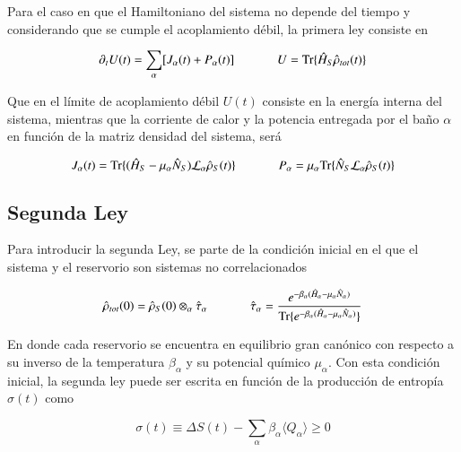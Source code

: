 Para el caso en que el Hamiltoniano del sistema no depende del tiempo y considerando que se cumple el acoplamiento débil, la primera ley consiste en

\begin{equation*}
    \partial_{t}U(t) = \sum_{\alpha}[J_{\alpha}(t) + P_{\alpha}(t) ] \hspace{12mm} U = \text{Tr}\{\hat{H}_{S}\hat{\rho}_{tot}(t) \}
\end{equation*}

Que en el límite de acoplamiento débil $U(t)$ consiste en la energía interna del sistema, mientras que la corriente de calor y la potencia entregada por el baño $\alpha$ en función de la matriz densidad del sistema, será 

\begin{equation*}
    J_{\alpha}(t) = \text{Tr}\{(\hat{H}_{S} - \mu_{\alpha}\hat{N}_S)\mathcal{L}_{\alpha}\hat{\rho}_{S}(t) \} \hspace{12mm} P_{\alpha} = \mu_{\alpha} \text{Tr}\{\hat{N}_{S}\mathcal{L}_{\alpha}\hat{\rho}_{S}(t) \} 
\end{equation*}

\subsection{Segunda Ley}
Para introducir la segunda Ley, se parte de la condición inicial en el que el sistema y el reservorio son sistemas no correlacionados

\begin{equation*}
    \hat{\rho}_{tot}(0) = \hat{\rho}_{S}(0)\otimes_{\alpha}\hat{\tau}_{\alpha} \hspace{12mm} \hat{\tau}_{\alpha} = \frac{e^{-\beta_{\alpha}(\hat{H}_{\alpha}-\mu_{\alpha}\hat{N}_{\alpha}) }}{ \text{Tr}\{e^{-\beta_{\alpha}(\hat{H}_{\alpha} - \mu_{\alpha}\hat{N}_{\alpha})}\} }
\end{equation*}

En donde cada reservorio se encuentra en equilibrio gran canónico con respecto a su inverso de la temperatura $\beta_{\alpha}$ y su potencial químico $\mu_{\alpha}$. Con esta condición inicial, la segunda ley puede ser escrita en función de la producción de entropía $\sigma(t)$ como \cite{esposito2010entropy}

\begin{equation*}
    \sigma(t) \equiv \Delta S(t) - \sum_{\alpha}\beta_{\alpha}\langle Q_{\alpha}\rangle \geq 0
\end{equation*}

